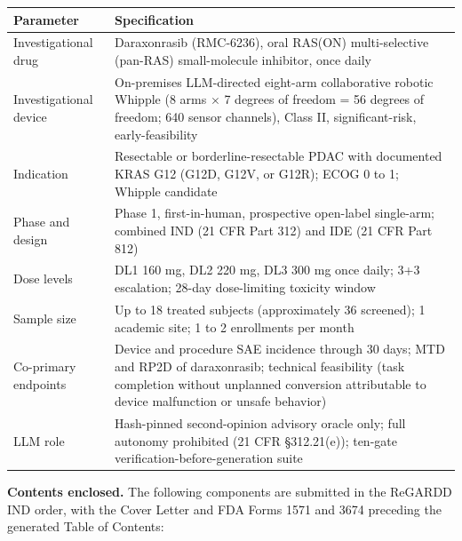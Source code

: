 \noindent\begin{tabularx}{\textwidth}{L{4.0cm} Y}
\toprule
\textbf{Parameter} & \textbf{Specification} \\
\midrule
Investigational drug & Daraxonrasib (RMC-6236), oral RAS(ON) multi-selective (pan-RAS) small-molecule inhibitor, once daily \\
Investigational device & On-premises LLM-directed eight-arm collaborative robotic Whipple (8 arms $\times$ 7 degrees of freedom = 56 degrees of freedom; 640 sensor channels), Class II, significant-risk, early-feasibility \\
Indication & Resectable or borderline-resectable PDAC with documented KRAS G12 (G12D, G12V, or G12R); ECOG 0 to 1; Whipple candidate \\
Phase and design & Phase 1, first-in-human, prospective open-label single-arm; combined IND (21 CFR Part 312) and IDE (21 CFR Part 812) \\
Dose levels & DL1 160 mg, DL2 220 mg, DL3 300 mg once daily; 3+3 escalation; 28-day dose-limiting toxicity window \\
Sample size & Up to 18 treated subjects (approximately 36 screened); 1 academic site; 1 to 2 enrollments per month \\
Co-primary endpoints & Device and procedure SAE incidence through 30 days; MTD and RP2D of daraxonrasib; technical feasibility (task completion without unplanned conversion attributable to device malfunction or unsafe behavior) \\
LLM role & Hash-pinned second-opinion advisory oracle only; full autonomy prohibited (21 CFR \S 312.21(e)); ten-gate verification-before-generation suite \\
\bottomrule
\end{tabularx}

\noindent\textbf{Contents enclosed.} The following components are submitted in the ReGARDD IND order, with the Cover Letter and FDA Forms 1571 and 3674 preceding the generated Table of Contents:

